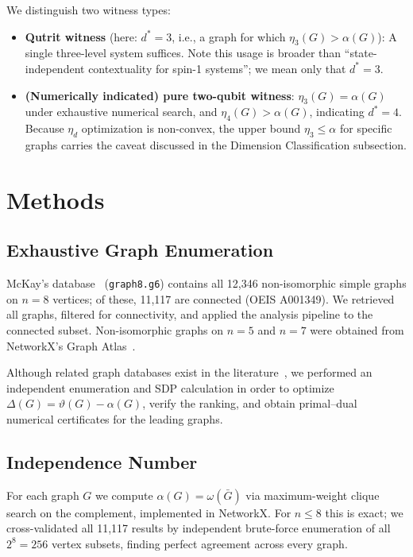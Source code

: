 \documentclass[aps,pra,twocolumn,superscriptaddress,longbibliography,floatfix]{revtex4-2}
\newcommand{\vt}{\vartheta}
\newcommand{\al}{\alpha}
\newcommand{\De}{\Delta}
\begin{document}
We distinguish two witness types:
\begin{itemize}
  \item \textbf{Qutrit witness} (here: $d^*=3$, i.e., a graph for which
        $\eta_3(G)>\al(G)$): A single three-level system suffices.
        Note this usage is broader than ``state-independent contextuality
        for spin-1 systems''; we mean only that $d^*=3$.
  \item \textbf{(Numerically indicated) pure two-qubit witness}:
        $\eta_3(G)=\al(G)$ under exhaustive numerical search, and
        $\eta_4(G)>\al(G)$, indicating $d^*=4$.
        Because $\eta_d$ optimization is non-convex, the upper bound
        $\eta_3\leq\al$ for specific graphs carries the caveat discussed
        in the Dimension Classification subsection.
\end{itemize}

\section{Methods}

\subsection{Exhaustive Graph Enumeration}

McKay's database~\cite{McKay2014} (\texttt{graph8.g6}) contains all
12{,}346 non-isomorphic simple graphs on $n=8$ vertices;
of these, 11{,}117 are connected (OEIS A001349).
We retrieved all graphs, filtered for connectivity, and applied the
analysis pipeline to the connected subset.
Non-isomorphic graphs on $n=5$ and $n=7$ were obtained from NetworkX's
Graph Atlas~\cite{Hagberg2008}.

Although related graph databases exist in the
literature~\cite{Amselem2012,Canas2016,McKay2014}, we performed an
independent enumeration and SDP calculation in order to optimize
$\De(G)=\vt(G)-\al(G)$, verify the ranking, and obtain primal--dual
numerical certificates for the leading graphs.

\subsection{Independence Number}

For each graph $G$ we compute $\al(G)=\omega(\bar{G})$ via maximum-weight
clique search on the complement, implemented in NetworkX.
For $n\leq8$ this is exact; we cross-validated all 11{,}117 results by
independent brute-force enumeration of all $2^8=256$ vertex subsets,
finding perfect agreement across every graph.
\end{document}
